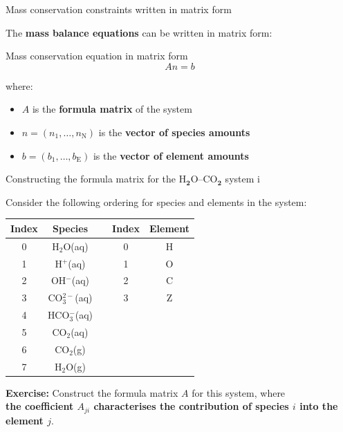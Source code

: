 %
\begin{frame}{Mass conservation constraints written in matrix form}

The {\bf mass balance equations} can be written in matrix form: \\[10pt]

\begin{cbox}{Mass conservation equation in matrix form}{\Large{}
\[
An=b
\]
}\end{cbox}where:
\begin{itemize}
\item $A$ is the \textbf{formula matrix} of the system
\item $n=(n_{1},\ldots,n_{\text{N}})$ is the \textbf{vector of species
amounts}
\item $b=(b_{1},\ldots,b_{\text{E}})$ is the \textbf{vector of element
amounts}
\end{itemize}
\end{frame}
%
%
\begin{frame}[<+->]{Constructing the formula matrix for the H$_{\boldsymbol{2}}$O–CO$_{\boldsymbol{2}}$ system\; i}

Consider the following ordering for species and elements in the system:
\begin{center}
\begin{tabular*}{1\textwidth}{@{\extracolsep{\fill}}ccccc}
\toprule 
\textbf{Index} & \textbf{Species} &  & \textbf{Index} & \textbf{Element}\tabularnewline
\midrule
0 & H$_{2}$O(aq) &  & 0 & H\tabularnewline
1 & H$^{+}$(aq) &  & 1 & O\tabularnewline
2 & OH$^{-}$(aq) &  & 2 & C\tabularnewline
3 & CO$_{3}^{2-}$(aq) &  & 3 & Z\tabularnewline
4 & HCO$_{3}^{-}$(aq) &  &  & \tabularnewline
5 & CO$_{2}$(aq) &  &  & \tabularnewline
6 & CO$_{2}$(g) &  &  & \tabularnewline
7 & H$_{2}$O(g) &  &  & \tabularnewline
\bottomrule
\end{tabular*}
\par\end{center}

\alert{\textbf{Exercise:}} Construct the formula matrix $A$ for this system, where \\
\alert{\textbf{the coefficient $A_{ji}$ characterises the contribution of species 
$i$ into the element $j$}}. 
\end{frame}
%

